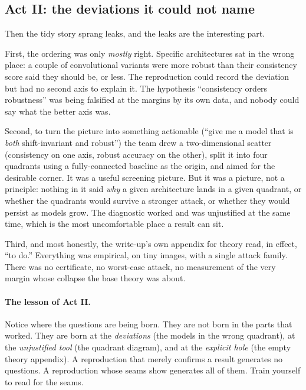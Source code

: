 \subsection{Act II: the deviations it could not name}
\label{sub:p2-act2}

Then the tidy story sprang leaks, and the leaks are the interesting part.

First, the ordering was only \emph{mostly} right. Specific architectures sat in the wrong place:
a couple of convolutional variants were more robust than their consistency score said they should
be, or less. The reproduction could record the deviation but had no second axis to explain it.
The hypothesis ``consistency orders robustness'' was being falsified at the margins by its own data,
and nobody could say what the better axis was.

Second, to turn the picture into something actionable (``give me a model that is \emph{both}
shift-invariant and robust'') the team drew a two-dimensional scatter (consistency on one axis,
robust accuracy on the other), split it into four quadrants using a fully-connected baseline as the
origin, and aimed for the desirable corner. It was a useful screening picture. But it was a picture,
not a principle: nothing in it said \emph{why} a given architecture lands in a given quadrant, or
whether the quadrants would survive a stronger attack, or whether they would persist as models grow.
The diagnostic worked and was unjustified at the same time, which is the most uncomfortable place a
result can sit.

Third, and most honestly, the write-up's own appendix for theory read, in effect, ``to do.''
Everything was empirical, on tiny images, with a single attack family. There was no certificate, no
worst-case attack, no measurement of the very margin whose collapse the base theory was about.

\paragraph{The lesson of Act II.} Notice where the questions are being born. They are not born in the
parts that worked. They are born at the \emph{deviations} (the models in the wrong quadrant), at the
\emph{unjustified tool} (the quadrant diagram), and at the \emph{explicit hole} (the empty theory
appendix). A reproduction that merely confirms a result generates no questions. A reproduction whose
seams show generates all of them. Train yourself to read for the seams.

